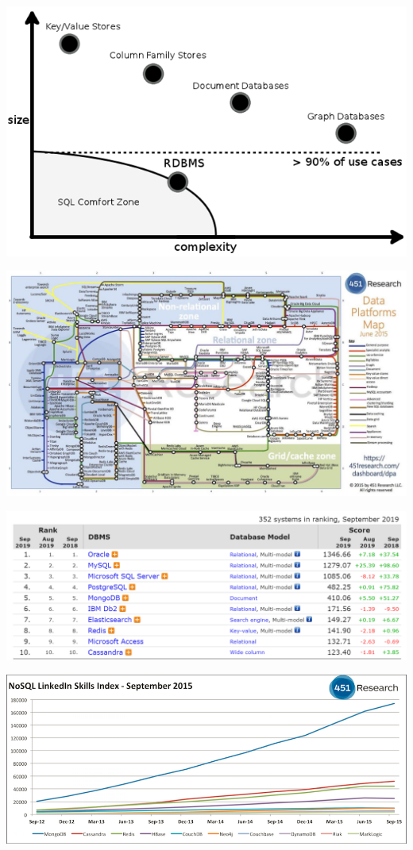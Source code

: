 \documentclass[
]{book}
\begin{document}
\includegraphics{images/TiposBBDDNoSQL2.png}

\includegraphics{images/451ResearchMap.png}

\includegraphics{images/DBEnginesRanking.png}

\includegraphics{images/451ResearchSkills.png}
\end{document}
